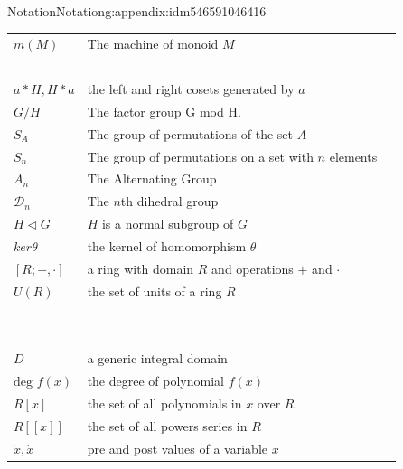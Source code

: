\documentclass[oneside,10pt,]{book}
\numberwithin{equation}{section}
\begin{document}
\begin{appendixptx}{Notation}{}{Notation}{}{}{g:appendix:idm546591046416}
\begin{longtable}[l]{lp{}r}
\(m(M)\)&The machine of monoid \(M\)&\pageref{g:notation:idm546593797152}\\
\(\)&&\pageref{g:notation:idm546593740256}\\
\(a*H, H*a\)&the left and right cosets generated by \(a\)&\pageref{g:notation:idm546593533168}\\
\(G/H\)&The factor group G mod H.&\pageref{g:notation:idm546593407456}\\
\(S_A\)&The group of permutations of the set \(A\)&\pageref{g:notation:idm546593312064}\\
\(S_n\)&The group of permutations on a set with \(n\) elements&\pageref{g:notation:idm546593311088}\\
\(A_n\)&The Alternating Group&\pageref{g:notation:idm546593234704}\\
\(\mathcal{D}_n\)&The \(n\)th dihedral group&\pageref{g:notation:idm546593160656}\\
\(H \triangleleft  G\)&\(H\) is a normal subgroup of \(G\)&\pageref{g:notation:idm546593031872}\\
\(ker \theta\)&the kernel of homomorphism \(\theta\)&\pageref{g:notation:idm546594385744}\\
\([R; +, \cdot]\)&a ring with domain \(R\) and operations \(+\) and \(\cdot\)&\pageref{g:notation:idm546594153200}\\
\(U(R)\)&the set of units of a ring \(R\)&\pageref{g:notation:idm546594096512}\\
\(\)&&\pageref{g:notation:idm546594077168}\\
\(\)&&\pageref{g:notation:idm546591901792}\\
\(D\)&a generic integral domain&\pageref{g:notation:idm546591877024}\\
\(\textrm{deg }f(x)\)&the degree of polynomial \(f(x)\)&\pageref{g:notation:idm546591634576}\\
\(R[x]\)&the set of all polynomials in \(x\) over \(R\)&\pageref{g:notation:idm546591633600}\\
\(R[[x]]\)&the set of all powers series in \(R\)&\pageref{g:notation:idm546591243456}\\
\(\grave x,  \acute x\)&pre and post values of a variable \(x\)&\pageref{g:notation:idm546591072112}\\
\end{longtable}
\end{appendixptx}
%
\backmatter
%
%
%
\typeout{************************************************}
\typeout{************************************************}
\end{document}
